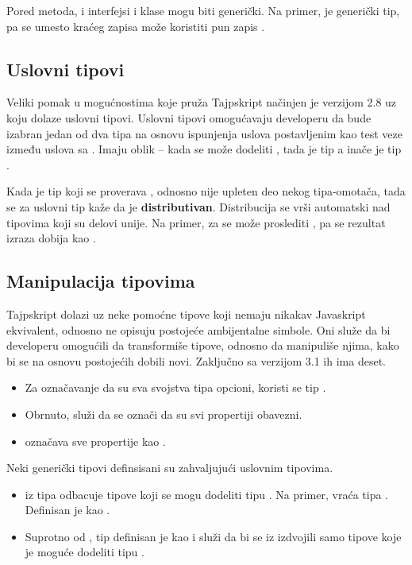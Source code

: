 Pored metoda, i interfejsi i klase mogu biti generički.
Na primer,  je generički tip, pa se umesto kraćeg zapisa  može koristiti pun zapis .

\subsection{Uslovni tipovi}

Veliki pomak u mogućnostima koje pruža Tajpskript načinjen je verzijom 2.8 uz koju dolaze uslovni tipovi.
Uslovni tipovi omogućavaju developeru da bude izabran jedan od dva tipa na osnovu ispunjenja uslova postavljenim kao test veze između uslova sa .
Imaju oblik  -- kada se  može dodeliti , tada je tip  a inače je tip .

Kada je tip koji se proverava , odnosno nije upleten deo nekog tipa-omotača, tada se za uslovni tip kaže da je \textbf{distributivan}.
Distribucija se vrši automatski nad tipovima koji su delovi unije.
Na primer, za  se može proslediti , pa se rezultat izraza  dobija kao .

\subsection{Manipulacija tipovima}

Tajpskript dolazi uz neke pomoćne tipove koji nemaju nikakav Javaskript ekvivalent, odnosno ne opisuju postojeće ambijentalne simbole.
Oni služe da bi developeru omogućili da transformiše tipove, odnosno da manipuliše njima, kako bi se na osnovu postojećih dobili novi.
Zaključno sa verzijom 3.1 ih ima deset.

\begin{itemize}
\item Za označavanje da su sva svojstva tipa  opcioni, koristi se tip .
\item Obrnuto,  služi da se označi da su svi propertiji obavezni.
\item {} označava sve propertije kao .
\end{itemize}

Neki generički tipovi definsisani su zahvaljujući uslovnim tipovima.

\begin{itemize}
\item {} iz tipa  odbacuje tipove koji se mogu dodeliti tipu . Na primer,  vraća tipa . Definisan je kao .
\item Suprotno od , tip  definisan je kao  i služi da bi se iz  izdvojili samo tipove koje je moguće dodeliti tipu .
\end{itemize}

